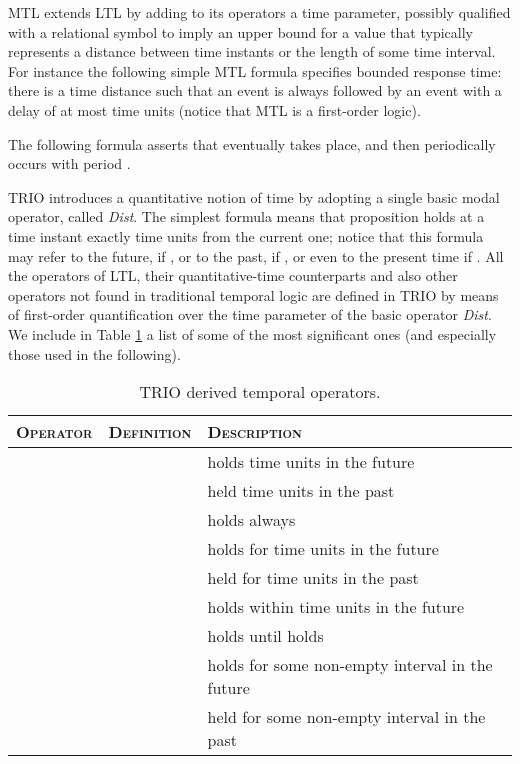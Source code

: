 MTL extends LTL by adding to its operators a  time
parameter, possibly qualified with a relational symbol to imply an
upper bound for a value that typically represents a distance between
time instants or the length of some time interval.  For instance the
following simple MTL formula specifies bounded response time: there is
a time distance  such that an event  is always followed by an
event  with a delay of at most  time units (notice that MTL is
a first-order logic).


The following formula asserts that  eventually takes place, and then periodically occurs with period .


TRIO introduces a quantitative notion of time by adopting a single 
basic modal operator, called \emph{Dist}. The simplest formula 
means that proposition  holds at a time instant exactly 
time units from the current one; notice that this formula may 
refer to the future, if , or to the past, if , 
or even to the present time if . All the operators of 
LTL, their quantitative-time counterparts and also other operators 
not found in traditional temporal logic are defined in TRIO by 
means of first-order quantification over the time parameter of 
the basic operator \emph{Dist}. We include in Table \ref{tab:trio-operators} a list of some 
of the most significant ones (and especially those used in the following).

\begin{table}[tbh]
\begin{center}
  \begin{scriptsize}
\begin{tabular}{|c|c|p{4.8cm}|}
    \hline
    \textsc{Operator}        &  \textsc{Definition}  &   \textsc{Description}\\
    \hline
                 &     &    holds  time units in the future \\
                 &    &    held  time units in the past \\

                     &         &    holds always \\

                &   &   holds for  time units in the future \\
               &   &   held for  time units in the past \\

              &   &   holds within  time units in the future \\

               &    &   holds until  holds \\ 

                 &   &    holds for some non-empty interval in the future \\

                &   &    held for some non-empty interval in the past \\
    \hline
  \end{tabular}
  \end{scriptsize}
\end{center}
\caption{TRIO derived temporal operators.}
\label{tab:trio-operators}
\end{table}

